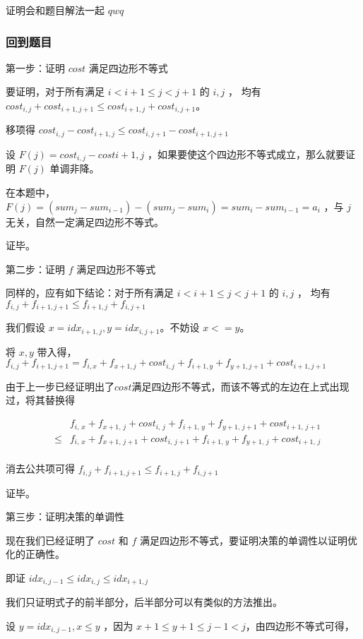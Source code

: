 证明会和题目解法一起 $qwq$ 

\subsubsection{回到题目}

第一步：证明 $cost$ 满足四边形不等式

要证明，对于所有满足 $i<i+1\le j<j+1$ 的 $i,j$ ， 均有 $cost_{i,j}+cost_{i+1,j+1}\le cost_{i+1,j}+cost_{i,j+1}$。

移项得 $cost_{i,j}-cost_{i+1,j}\le cost_{i,j+1}-cost_{i+1,j+1}$

设 $F(j)=cost_{i,j}-cost{i+1,j}$ ，如果要使这个四边形不等式成立，那么就要证明 $F(j)$ 单调非降。

在本题中， $F(j)=(sum_j-sum_{i-1})-(sum_j-sum_i)=sum_i-sum_{i-1}=a_i$ ，与 $j$ 无关，自然一定满足四边形不等式。

证毕。

第二步：证明 $f$ 满足四边形不等式

同样的，应有如下结论：对于所有满足 $i<i+1\le j<j+1$ 的 $i,j$ ， 均有 $f_{i,j}+f_{i+1,j+1}\le f_{i+1,j}+f_{i,j+1}$

我们假设 $x=idx_{i+1,j},y=idx_{i,j+1}$。不妨设 $x<=y$。

将 $x,y$ 带入得，$f_{i,j}+f_{i+1,j+1}=f_{i,x}+f_{x+1,j}+cost_{i,j}+f_{i+1,y}+f_{y+1,j+1}+cost_{i+1,j+1}$

由于上一步已经证明出了$cost$满足四边形不等式，而该不等式的左边在上式出现过，将其替换得

$$
\begin{aligned}
&&f_{i,\,x}+f_{x+1,\,j}+cost_{i,\,j}+f_{i+1,\,y}+f_{y+1,\,j+1}+cost_{i+1,\,j+1}\\
&\le&f_{i,\,x}+f_{x+1,\,j+1}+cost_{i,\,j+1}+f_{i+1,\,y}+f_{y+1,\,j}+cost_{i+1,\,j}\\
\end{aligned}
$$

消去公共项可得 $f_{i,j}+f_{i+1,j+1}\le f_{i+1,j}+f_{i,j+1}$

证毕。

第三步：证明决策的单调性

现在我们已经证明了 $cost$ 和 $f$ 满足四边形不等式，要证明决策的单调性以证明优化的正确性。

即证 $idx_{i,j-1}\le idx_{i,j}\le idx_{i+1,j}$

我们只证明式子的前半部分，后半部分可以有类似的方法推出。

设 $y=idx_{i,j-1},x\le y$ ，因为 $x+1\le y+1\le j-1<j$，由四边形不等式可得，

